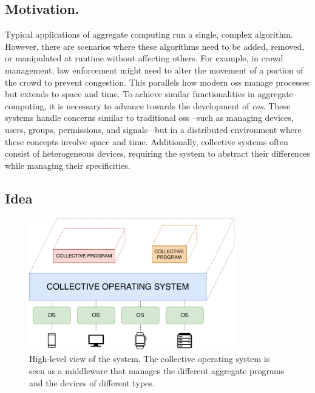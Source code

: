 \documentclass[12pt, a4paper]{article}
\begin{document}
\subsection{Motivation.}
\label{subsec:motivation.}

Typical applications of aggregate computing run a single, complex algorithm.
%
However,
there are scenarios where these algorithms need to be added, removed,
or manipulated at runtime without affecting others.
%
For example, in crowd management,
law enforcement might need to alter the movement of a portion of the crowd to prevent congestion.
%
This parallels how modern \acp{os} manage processes but extends to space and time.
%
To achieve similar functionalities in aggregate computing,
it is necessary to advance towards the development of \emph{\ac{cos}}.
%
These systems handle concerns similar to traditional \acp{os} --such as managing devices, users, groups, permissions, and signals--
but in a distributed environment where these concepts involve space and time.
%
Additionally,
collective systems often consist of heterogeneous devices,
requiring the system to abstract their differences while managing their specificities.

\subsection{Idea}
\label{subsec:idea}

\begin{figure}
    \centering
    \includegraphics[width=0.8\textwidth]{figures/system}
    \caption{
        High-level view of the system.
        The collective operating system is seen as a middleware that manages the different aggregate programs and the devices
        of different types.
    }\label{fig:system}
\end{figure}
\end{document}
